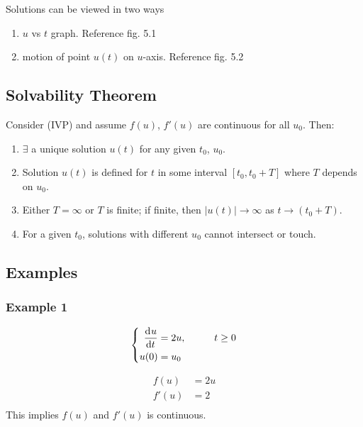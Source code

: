 \documentclass[12pt]{article}
\begin{document}
    Solutions can be viewed in two ways
    \begin{enumerate}
    \item $u$ vs $t$ graph. Reference fig. 5.1
    \item motion of point $u(t)$ on $u$-axis. Reference fig. 5.2
    \end{enumerate}

    \subsection{Solvability Theorem}
    Consider (IVP) and assume $f(u)$, $f'(u)$ are continuous for all $u_0$.
    Then:

    \begin{enumerate}
    \item $\exists$ a unique solution $u(t)$ for any given $t_0$, $u_0$.
    \item Solution $u(t)$ is defined for $t$ in some interval $[t_0,t_0+T]$
      where $T$ depends on $u_0$.
    \item Either $T=\infty$ or $T$ is finite; if finite, then
      $|u(t)| \rightarrow \infty$ as $t\rightarrow (t_0+T)$.
    \item For a given $t_0$, solutions with different $u_0$ cannot intersect or touch.
    \end{enumerate}

    \subsection{Examples}
    \subsubsection{Example 1}

      \begin{equation} \left\{
        \begin{aligned}
          \frac{\mathrm{d}^{} {u}}{\mathrm{d}{t}^{}} &= 2u,&\qquad t\ge0 \\
          u(0) &= u_0 \\
        \end{aligned}\right.
      \end{equation}

      \begin{equation}
        \begin{aligned}
          f(u) &= 2u \\
          f'(u) &= 2 \\
        \end{aligned}
      \end{equation}
      This implies $f(u)$ and $f'(u)$ is continuous.
\end{document}
